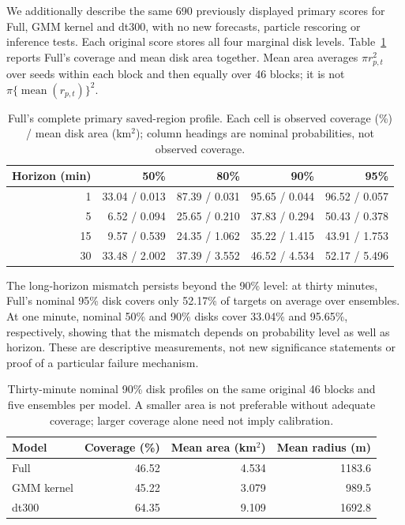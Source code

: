\documentclass[11pt]{article}
\begin{document}
We additionally describe the same 690 previously displayed primary scores
for Full, GMM kernel and dt300, with no new forecasts, particle rescoring or
inference tests. Each original score stores all four marginal disk levels.
Table~\ref{tab:full-calibration-area} reports Full's coverage and mean disk
area together. Mean area averages \(\pi r_{p,t}^2\) over seeds within each
block and then equally over 46 blocks; it is not
\(\pi\{\operatorname{mean}(r_{p,t})\}^2\).

\begin{table}[htbp]
\centering\small
\caption{Full's complete primary saved-region profile. Each cell is
observed coverage (\%) / mean disk area (km\(^{2}\)); column headings
are nominal probabilities, not observed coverage.}
\label{tab:full-calibration-area}
\begin{tabular}{rrrrr}
\toprule
Horizon (min) & 50\% & 80\% & 90\% & 95\%\\
\midrule
1 & 33.04 / 0.013 & 87.39 / 0.031 & 95.65 / 0.044 & 96.52 / 0.057\\
5 & 6.52 / 0.094 & 25.65 / 0.210 & 37.83 / 0.294 & 50.43 / 0.378\\
15 & 9.57 / 0.539 & 24.35 / 1.062 & 35.22 / 1.415 & 43.91 / 1.753\\
30 & 33.48 / 2.002 & 37.39 / 3.552 & 46.52 / 4.534 & 52.17 / 5.496\\
\bottomrule
\end{tabular}
\end{table}

The long-horizon mismatch persists beyond the 90\% level: at thirty minutes,
Full's nominal 95\% disk covers only 52.17\% of targets on average over
ensembles. At one minute, nominal 50\% and 90\% disks cover 33.04\% and
95.65\%, respectively, showing that the mismatch depends on probability
level as well as horizon. These are descriptive measurements, not new
significance statements or proof of a particular failure mechanism.

\begin{table}[htbp]
\centering\small
\caption{Thirty-minute nominal 90\% disk profiles on the same original
46 blocks and five ensembles per model. A smaller area is not preferable
without adequate coverage; larger coverage alone need not imply calibration.}
\label{tab:model-region-size}
\begin{tabular}{lrrr}
\toprule
Model & Coverage (\%) & Mean area (km\(^{2}\)) & Mean radius (m)\\
\midrule
Full & 46.52 & 4.534 & 1183.6\\
GMM kernel & 45.22 & 3.079 & 989.5\\
dt300 & 64.35 & 9.109 & 1692.8\\
\bottomrule
\end{tabular}
\end{table}
\end{document}
